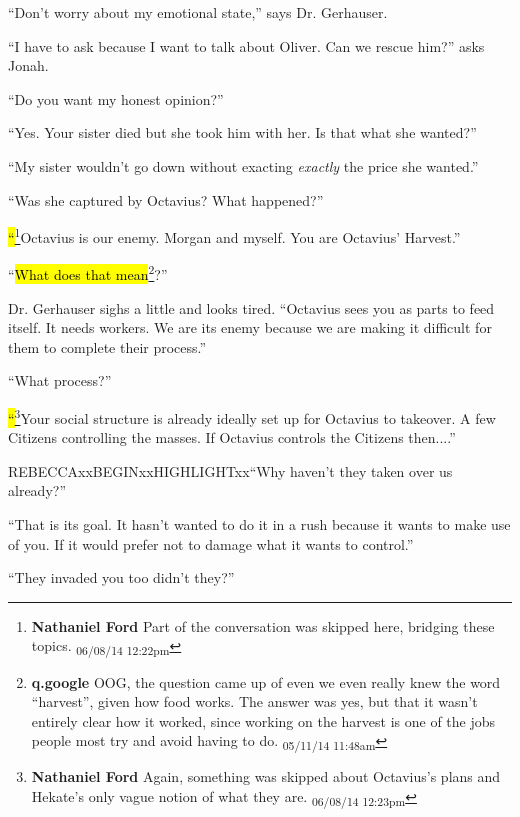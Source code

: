 ``Don't worry about my emotional state,'' says Dr. Gerhauser.

``I have to ask because I want to talk about Oliver.  Can we rescue him?'' asks Jonah.

``Do you want my honest opinion?''

``Yes. Your sister died but she took him with her.  Is that what she wanted?''

``My sister wouldn't go down without exacting \textit{exactly} the price she wanted.''

``Was she captured by Octavius?  What happened?''

\hl{``}\footnote{\textbf{Nathaniel Ford }Part of the conversation was skipped here, bridging these topics. \textsubscript{06/08/14 12:22pm}}Octavius is our enemy.  Morgan and myself.  You are Octavius' Harvest.''

``\hl{What does that mean}\footnote{\textbf{q.google }OOG, the question came up of even we even really knew the word ``harvest'', given how food works.  The answer was yes, but that it wasn't entirely clear how it worked, since working on the harvest is one of the jobs people most try and avoid having to do. \textsubscript{05/11/14 11:48am}}?''

Dr. Gerhauser sighs a little and looks tired.  ``Octavius sees you as parts to feed itself.  It needs workers.  We are its enemy because we are making it difficult for them to complete their process.''

``What process?''

\hl{``}\footnote{\textbf{Nathaniel Ford }Again, something was skipped about Octavius's plans and Hekate's only vague notion of what they are. \textsubscript{06/08/14 12:23pm}}Your social structure is already ideally set up for Octavius to takeover.  A few Citizens controlling the masses.  If Octavius controls the Citizens then....''

REBECCAxxBEGINxxHIGHLIGHTxx``Why haven't they taken over us already?''

``That is its goal.  It hasn't wanted to do it in a rush because it wants to make use of you.  If it would prefer not to damage what it wants to control.''

``They invaded you too didn't they?''

